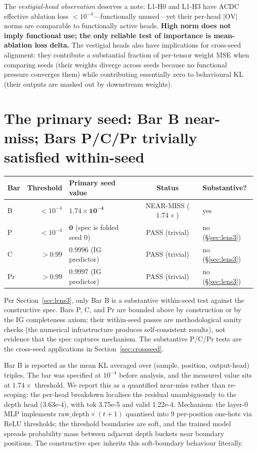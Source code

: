 \documentclass[11pt,letterpaper]{article}
\begin{document}
The \emph{vestigial-head observation} deserves a note: L1-H0 and L1-H3 have ACDC effective ablation loss $< 10^{-4}$---functionally unused---yet their per-head $|\mathrm{OV}|$ norms are comparable to functionally active heads. \textbf{High norm does not imply functional use; the only reliable test of importance is mean-ablation loss delta.} The vestigial heads also have implications for cross-seed alignment: they contribute a substantial fraction of per-tensor weight MSE when comparing seeds (their weights diverge across seeds because no functional pressure converges them) while contributing essentially zero to behavioural KL (their outputs are masked out by downstream weights).

\section{The primary seed: Bar B near-miss; Bars P/C/Pr trivially satisfied within-seed}
\label{sec:primary}

\begin{center}
\begin{tabular}{lrlcl}
\toprule
Bar & Threshold & Primary seed value & Status & Substantive? \\
\midrule
B  & $< 10^{-4}$ & $\mathbf{1.74 \times 10^{-4}}$ & NEAR-MISS ($1.74\times$) & yes \\
P  & $< 10^{-3}$ & $\mathbf{0}$ (spec is folded seed 0) & PASS (trivial) & no (§\ref{sec:lens3}) \\
C  & $> 0.99$ & $\mathbf{0.9996}$ (IG predictor) & PASS (trivial) & no (§\ref{sec:lens3}) \\
Pr & $> 0.99$ & $\mathbf{0.9997}$ (IG predictor) & PASS (trivial) & no (§\ref{sec:lens3}) \\
\bottomrule
\end{tabular}
\end{center}

Per Section~\ref{sec:lens3}, only Bar B is a substantive within-seed test against the constructive spec. Bars P, C, and Pr are bounded above by construction or by the IG completeness axiom; their within-seed passes are methodological sanity checks (the numerical infrastructure produces self-consistent results), not evidence that the spec captures mechanism. The substantive P/C/Pr tests are the cross-seed applications in Section~\ref{sec:crossseed}.

Bar B is reported as the mean KL averaged over (sample, position, output-head) triples. The bar was specified at $10^{-4}$ before analysis, and the measured value sits at $1.74\times$ threshold. We report this as a quantified near-miss rather than re-scoping: the per-head breakdown localises the residual unambiguously to the depth head (3.63e-4), with tok 3.75e-5 and valid 1.22e-4. Mechanism: the layer-0 MLP implements $\mathrm{raw\_depth} \times (t+1)$ quantised into 9 per-position one-hots via ReLU thresholds; the threshold boundaries are soft, and the trained model spreads probability mass between adjacent depth buckets near boundary positions. The constructive spec inherits this soft-boundary behaviour literally.
\end{document}
